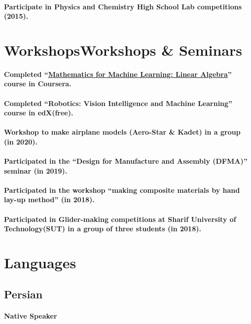 \documentclass[a4paper]{article}
\begin{document}
        \paragraph{Participate in Physics and Chemistry High School Lab competitions (2015).}
    \section{WorkshopsWorkshops \& Seminars}
        \paragraph{Completed “\href{https://coursera.org/share/727feebde54da2fa7042a84ce71c53e7}{Mathematics for Machine Learning: Linear Algebra}” course in Coursera.}
        \paragraph{Completed “Robotics: Vision Intelligence and Machine Learning” course in edX(free).}
        \paragraph{Workshop to make airplane models (Aero-Star \& Kadet) in a group (in 2020).}
        \paragraph{Participated in the “Design for Manufacture and Assembly (DFMA)” seminar (in 2019).}
        \paragraph{Participated in the workshop “making composite materials by hand lay-up method” (in 2018).}
        \paragraph{Participated in Glider-making competitions at Sharif University of Technology(SUT) in a group of three students (in 2018).}
    \section{Languages}
    \subsection{Persian}
        \paragraph{Native Speaker}
\end{document}
